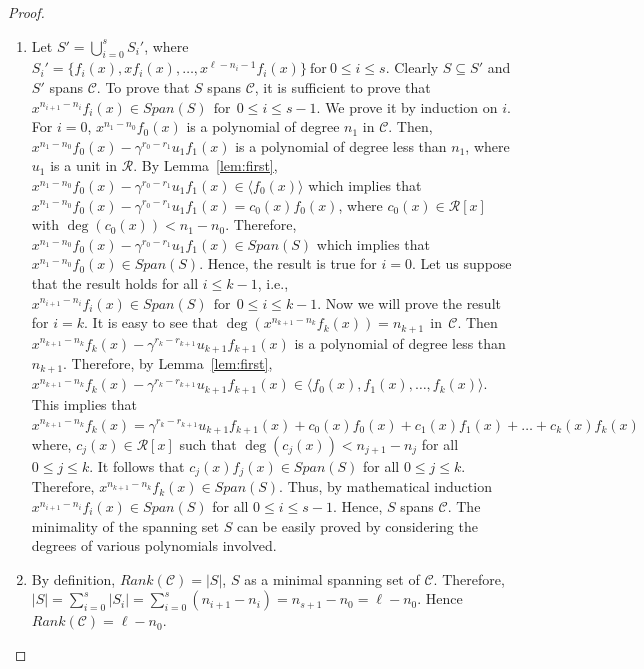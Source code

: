 \documentclass[12pt,a4paper]{article}
\begin{document}
\begin{proof}
    \begin{enumerate}
        \item Let $S'=\bigcup_{i=0}^s S_i'$, where $S_i'=\{f_i(x),xf_i(x), \dots , x^{\ell-n_i-1}f_i(x)\}~\text{for}~ 0 \le i \le s$. Clearly $S \subseteq S'$ and $S'$ spans $\mathcal{C}$. To prove that $S$ spans $\mathcal{C}$, it is sufficient to prove that $x^{n_{i+1}-n_{i}}f_i(x) \in Span(S)~~\text{for}~~0 \le i \le s-1$. We prove it by induction on $i$. For $i=0$, $x^{n_1-n_0}f_0(x)$ is a polynomial of degree $n_1$ in $\mathcal{C}$. Then, $x^{n_1-n_0}f_0(x)-\gamma^{r_0-r_1}u_1f_1(x)$ is a polynomial of degree less than $n_1$, where $u_1$ is a unit in $\mathcal{R}$. By Lemma~\ref{lem:first},  $x^{n_1-n_0}f_0(x)-\gamma^{r_0-r_1}u_1f_1(x)\in \langle f_0(x) \rangle$ which implies that $x^{n_1-n_0}f_0(x)-\gamma^{r_0-r_1}u_1f_1(x)= c_0(x)f_0(x)$, where $c_0(x) \in \mathcal{R}[x]$ with $\deg(c_0(x))<n_1-n_0$. Therefore, $x^{n_1-n_0}f_0(x)-\gamma^{r_0-r_1}u_1f_1(x) \in Span(S)$ which implies that $x^{n_1-n_0}f_0(x) \in Span(S)$. Hence, the result is true for $i=0$. Let us suppose that the result holds for all $i \le k-1$, i.e., $x^{n_{i+1}-n_{i}}f_i(x) \in Span(S)~~\text{for}~~0 \le i \le k-1$. Now we will prove the result for $i=k$. It is easy to see that $\deg(x^{n_{k+1}-n_{k}}f_k(x))=n_{k+1}~~\text{in}~~\mathcal{C}$. Then $x^{n_{k+1}-n_{k}}f_k(x)-\gamma^{r_k-r_{k+1}}u_{k+1}f_{k+1}(x)$ is a polynomial of degree less than $n_{k+1}$. Therefore, by Lemma~\ref{lem:first}, $x^{n_{k+1}-n_{k}}f_k(x)-\gamma^{r_k-r_{k+1}}u_{k+1}f_{k+1}(x)\in \langle f_0(x),f_1(x), \dots, f_k(x)\rangle$.  This implies that $x^{n_{k+1}-n_{k}}f_k(x)=\gamma^{r_k-r_{k+1}}u_{k+1}f_{k+1}(x)+c_0(x)f_0(x)+c_1(x)f_1(x)+\dots+c_k(x)f_k(x)$ where, $c_j(x)\in \mathcal{R}[x]$ such that $\deg(c_j(x))<n_{j+1}-n_j$ for all $0\le j \le k$. It follows that $c_j(x)f_j(x) \in Span(S)$ for all $0\le j \le k$. Therefore, $x^{n_{k+1}-n_{k}}f_k(x) \in Span(S)$. Thus, by mathematical induction $x^{n_{i+1}-n_{i}}f_i(x) \in Span(S)$ for all $0\le i \le s-1$. Hence, $S$ spans $\mathcal{C}$. The minimality of the spanning set $S$ can be easily proved by considering the degrees of various polynomials involved.
        \item By definition, $Rank(\mathcal{C})= |S|$, $S$ as a minimal spanning set of $\mathcal{C}$. Therefore, $|{S}|=\sum_{i=0}^{s}|S_i|=\sum_{i=0}^{s}(n_{i+1}-n_i)=n_{s+1}-n_0=\ell-n_0$. Hence $Rank(\mathcal{C})=\ell-n_0$.
        \end{enumerate}


\end{proof}
\end{document}
